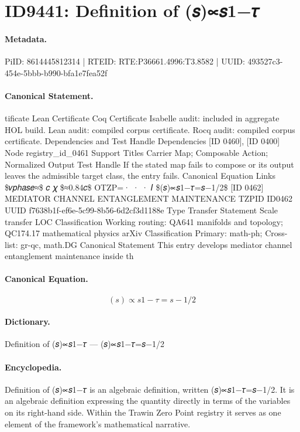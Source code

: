\section*{ID9441: Definition of (𝑠)∝𝑠1−𝜏}
\paragraph{Metadata.}
PiID: 8614445812314 | RTEID: RTE:P36661.4996:T3.8582 | UUID: 493527c3-454e-5bbb-b990-bfa1e7fea52f

\paragraph{Canonical Statement.}
tificate Lean Certificate Coq Certificate Isabelle audit: included in aggregate HOL build. Lean audit: compiled corpus certificate. Rocq audit: compiled corpus certificate. Dependencies and Test Handle Dependencies [ID 0460], [ID 0400] Node registry\_id\_0461 Support Titles Carrier Map; Composable Action; Normalized Output Test Handle If the stated map fails to compose or its output leaves the admissible target class, the entry fails. Canonical Equation Links \$𝑣𝑝ℎ𝑎𝑠𝑒≈\$ 𝑐 𝜒 \$≈0.84𝑐\$ OTZP=· · · 𝐼 \$(𝑠)∝𝑠1−𝜏=𝑠−1/2\$ [ID 0462] MEDIATOR CHANNEL ENTANGLEMENT MAINTENANCE TZPID ID0462 UUID f7638b1f-ef6e-5c99-8b56-6d2cf3d1188e Type Transfer Statement Scale transfer LOC Classification Working routing: QA641 manifolds and topology; QC174.17 mathematical physics arXiv Classification Primary: math-ph; Cross-list: gr-qc, math.DG Canonical Statement This entry develops mediator channel entanglement maintenance inside th

\paragraph{Canonical Equation.}
\[
(𝑠)∝𝑠1−𝜏=𝑠−1/2
\]

\paragraph{Dictionary.}
Definition of (𝑠)∝𝑠1−𝜏 — (𝑠)∝𝑠1−𝜏=𝑠−1/2

\paragraph{Encyclopedia.}
Definition of (𝑠)∝𝑠1−𝜏 is an algebraic definition, written (𝑠)∝𝑠1−𝜏=𝑠−1/2. It is an algebraic definition expressing the quantity directly in terms of the variables on its right-hand side. Within the Trawin Zero Point registry it serves as one element of the framework's mathematical narrative.

